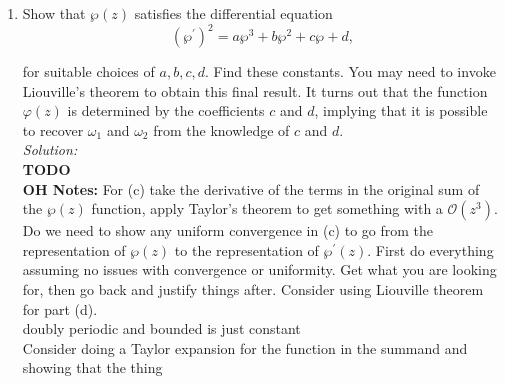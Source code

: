 \documentclass[10pt]{amsart}
\theoremstyle{nonumberplain}
\begin{document}
\begin{enumerate}[label={\bf {\arabic*}:}]
\begin{enumerate}
\item Show that $\wp(z)$ satisfies the differential equation
$$ \left(\wp^{\prime}\right)^2=a \wp^3+b \wp^2+c \wp+d, $$

for suitable choices of $a, b, c, d$. Find these constants. You may need to invoke Liouville's theorem to obtain this final result. It turns out that the function $\varphi(z)$ is determined by the coefficients $c$ and $d$, implying that it is possible to recover $\omega_1$ and $\omega_2$ from the knowledge of $c$ and $d$. \\
\textit{Solution:} \\
\textbf{TODO} \\


{\bf OH Notes: }
For (c) take the derivative of the terms in the original sum of the $\wp(z)$ function, apply Taylor's theorem to get something with a $\mathcal O(z^3)$.
Do we need to show any uniform convergence in (c) to go from the representation of $\wp(z)$ to the representation of $\wp^\prime(z)$.
First do everything assuming no issues with convergence or uniformity.
Get what you are looking for, then go back and justify things after.
Consider using Liouville theorem for part (d). \\

\noindent
doubly periodic and bounded is just constant \\

\noindent
Consider doing a Taylor expansion for the function in the summand and showing that the thing

\end{enumerate}
\end{enumerate}
\end{document}
